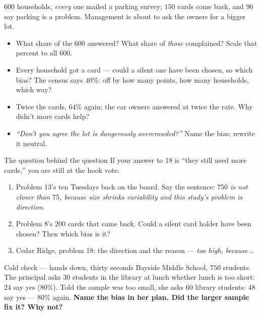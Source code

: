 \documentclass[aspectratio=169, 11pt]{beamer}
\begin{document}
\begin{frame}[t, plain]
  $600$ households, \emph{every} one mailed a parking survey; $150$ cards come back, and $96$
  say parking is a problem. Management is about to ask the owners for a bigger lot.
  \begin{itemize}\setlength{\itemsep}{4pt}
    \item[16.] What share of the $600$ answered? What share of \emph{those} complained? Scale
          that percent to all $600$.
    \item[17.] Every household got a card --- could a silent one have been chosen, so which
          bias? The census says $40\%$: off by how many points, how many households, which way?
    \item[18.] Twice the cards, $64\%$ again; the car owners answered at twice the rate. Why didn't
          more cards help?
    \item[19.] \emph{``Don't you agree the lot is dangerously overcrowded?''} Name the bias; rewrite it neutral.
  \end{itemize}
  \begin{block}{The question behind the question}
    If your answer to 18 is ``they still need more cards,'' you are still at the hook vote.
  \end{block}
\end{frame}

\begin{frame}[t, plain]
  \vspace{4pt}
  \begin{enumerate}\setlength{\itemsep}{5pt}
    \item Problem 13's ten Tuesdays back on the board. Say the sentence: \emph{$750$ is not
          closer than $75$, because size shrinks variability and this study's problem is direction.}
    \item Problem 8's $200$ cards that came back. Could a silent card holder have been chosen?
          Then which bias is it?
    \item Cedar Ridge, problem 18: the direction and the reason --- \emph{too high, because}\,\ldots
  \end{enumerate}
  \vspace{6pt}
  \begin{block}{Cold check --- hands down, thirty seconds}
    Bayside Middle School, $750$ students. The principal asks $30$ students in the library at
    lunch whether lunch is too short: $24$ say yes ($80\%$). Told the sample was too small, she
    asks $60$ library students: $48$ say yes --- $80\%$ again. \textbf{Name the bias in her plan.
    Did the larger sample fix it? Why not?}
  \end{block}
\end{frame}
\end{document}
